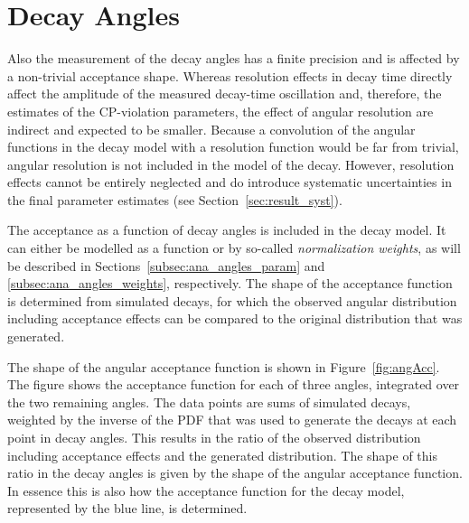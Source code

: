 \section{Decay Angles}
\label{sec:ana_angles}

Also the measurement of the decay angles has a finite precision and is affected by a non-trivial acceptance shape. Whereas resolution
effects in decay time directly affect the amplitude of the measured decay-time oscillation and, therefore, the estimates of the
CP-violation parameters, the effect of angular resolution are indirect and expected to be smaller. Because a convolution of the angular
functions in the decay model with a resolution function would be far from trivial, angular resolution is not included in the model of the
decay. However, resolution effects cannot be entirely neglected and do introduce systematic uncertainties in the final parameter estimates
(see Section~\ref{sec:result_syst}).

The acceptance as a function of decay angles is included in the decay model. It can either be modelled as a function or by so-called
\emph{normalization weights}, as will be described in Sections~\ref{subsec:ana_angles_param} and \ref{subsec:ana_angles_weights},
respectively. The shape of the acceptance function is determined from simulated decays, for which the observed angular distribution
including acceptance effects can be compared to the original distribution that was generated.

The shape of the angular acceptance function is shown in Figure~\ref{fig:angAcc}. The figure shows the acceptance function for each of
three angles, integrated over the two remaining angles. The data points are sums of simulated decays, weighted by the inverse of the PDF
that was used to generate the decays at each point in decay angles. This results in the ratio of the observed distribution including
acceptance effects and the generated distribution. The shape of this ratio in the decay angles is given by the shape of the angular
acceptance function. In essence this is also how the acceptance function for the decay model, represented by the blue line, is determined.

